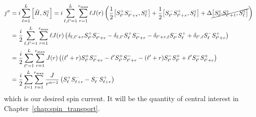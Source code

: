 \begin{align}
    j^{\sigma} & = i \sum_{\ell=1}^L \comm{\hat{H} }{\Sz_{\ell}} = i \sum_{\ell,\ell^{\prime}=1}^L \sum_{r=1}^{r_{\mathrm{max}}}
    \ell J(r) \left(\frac{1}{2}\comm{\Sp_{\ell^{\prime}}\Sm_{\ell^{\prime}+r}}{\Sz_{\ell}}
    + \frac{1}{2}\comm{\Sm_{\ell^{\prime}}\Sp_{\ell^{\prime}+r}}{\Sz_{\ell}}
    + \Delta \cancel{\comm{\Sz_{\ell^{\prime}}\Sz_{\ell^{\prime}+1}}{\Sz_{\ell}}} \right) \nonumber                       \\
               & = \frac{i}{2}  \sum_{\ell,\ell^{\prime}=1}^L \sum_{r=1}^{r_{\mathrm{max}}}\ell J(r)  \left(
    \delta_{\ell,\ell^{\prime}+r}\Sp_{\ell^{\prime}} \Sm_{\ell^{\prime}+r}  - \delta_{\ell,\ell^{\prime}}
    \Sp_{\ell}\Sm_{\ell^{\prime}+r} - \delta_{\ell^{\prime} + r, \ell} \Sm_{\ell^{\prime}} \Sp_{\ell} +
    \delta_{\ell^{\prime},\ell}\Sm_{\ell}\Sp_{\ell^{\prime}+r}
    \right) \nonumber                                                                                                     \\
               & = \frac{i}{2}  \sum_{\ell^{\prime}=1}^L \sum_{r=1}^{r_{\mathrm{max}}} J(r)  \left(
    (\ell^{\prime}+r)\Sp_{\ell^{\prime}} \Sm_{\ell^{\prime}+r}  - \ell^{\prime}
    \Sp_{\ell^{\prime}}\Sm_{\ell^{\prime}+r} - (\ell^{\prime}+r) \Sm_{\ell^{\prime}} \Sp_{\ell^{\prime}} +
    \ell^{\prime}\Sm_{\ell^{\prime}}\Sp_{\ell^{\prime}+r}
    \right) \nonumber                                                                                                     \\
               & = \frac{i}{2} \sum_{\ell=1}^L \sum_{r=1}^{r_{\mathrm{max}}} \frac{J}{r^{\alpha-1}}
    \left(\Sp_{\ell}\Sm_{\ell+r}-\Sm_{\ell}\Sp_{\ell+r}\right)
    \label{eq:spin_current}
\end{align}
which is our desired spin current. It will be the quantity of central interest in Chapter~\ref{chap:spin_transport}.

